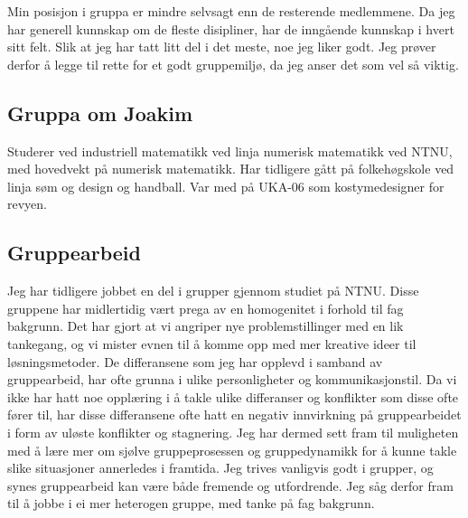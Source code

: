 Min posisjon i gruppa er mindre selvsagt enn de resterende medlemmene. Da jeg har generell
kunnskap om de fleste disipliner, har de inngående kunnskap i hvert sitt felt.
Slik at jeg har tatt litt del i det meste, noe jeg liker godt. Jeg prøver derfor
å legge til rette for et godt gruppemiljø, da jeg anser det som vel så viktig.

\subsection*{Gruppa om Joakim}




Studerer ved industriell matematikk ved linja numerisk matematikk ved NTNU, med hovedvekt på numerisk matematikk. Har tidligere gått på folkehøgskole ved linja søm og design og handball. Var med på UKA-06 som kostymedesigner for revyen.

\subsection*{Gruppearbeid}
Jeg har tidligere jobbet en del i grupper gjennom studiet på NTNU. Disse gruppene har midlertidig vært prega av en homogenitet i forhold til fag bakgrunn. Det har gjort at vi angriper nye problemstillinger med en lik tankegang, og vi mister evnen til å komme opp med mer kreative ideer til løsningsmetoder. De differansene som jeg har opplevd i samband av gruppearbeid, har ofte grunna i ulike personligheter og kommunikasjonstil. Da vi ikke har hatt noe opplæring i å takle ulike differanser og konflikter som disse ofte fører til, har disse differansene ofte hatt en negativ innvirkning på gruppearbeidet i form av uløste konflikter og stagnering. Jeg har dermed sett fram til muligheten med å lære mer om sjølve gruppeprosessen og gruppedynamikk for å kunne takle slike situasjoner annerledes i framtida. Jeg trives vanligvis godt i grupper, og synes gruppearbeid kan være både fremende og utfordrende.  Jeg såg derfor fram til å jobbe i ei mer heterogen gruppe, med tanke på fag bakgrunn.


